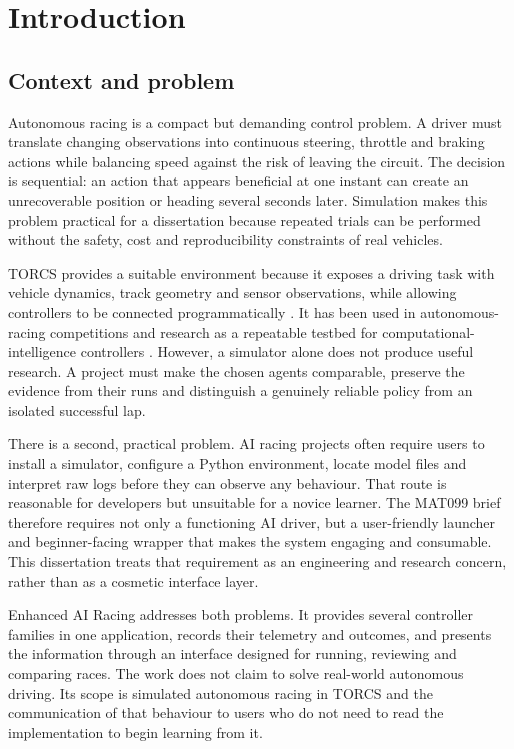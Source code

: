 \section{Introduction}
\label{ch:introduction}

\subsection{Context and problem}

Autonomous racing is a compact but demanding control problem. A driver must translate changing observations into continuous steering, throttle and braking actions while balancing speed against the risk of leaving the circuit. The decision is sequential: an action that appears beneficial at one instant can create an unrecoverable position or heading several seconds later. Simulation makes this problem practical for a dissertation because repeated trials can be performed without the safety, cost and reproducibility constraints of real vehicles.

TORCS provides a suitable environment because it exposes a driving task with vehicle dynamics, track geometry and sensor observations, while allowing controllers to be connected programmatically \parencite{torcs2026}. It has been used in autonomous-racing competitions and research as a repeatable testbed for computational-intelligence controllers \parencite{loiacono2010}. However, a simulator alone does not produce useful research. A project must make the chosen agents comparable, preserve the evidence from their runs and distinguish a genuinely reliable policy from an isolated successful lap.

There is a second, practical problem. AI racing projects often require users to install a simulator, configure a Python environment, locate model files and interpret raw logs before they can observe any behaviour. That route is reasonable for developers but unsuitable for a novice learner. The MAT099 brief therefore requires not only a functioning AI driver, but a user-friendly launcher and beginner-facing wrapper that makes the system engaging and consumable. This dissertation treats that requirement as an engineering and research concern, rather than as a cosmetic interface layer.

Enhanced AI Racing addresses both problems. It provides several controller families in one application, records their telemetry and outcomes, and presents the information through an interface designed for running, reviewing and comparing races. The work does not claim to solve real-world autonomous driving. Its scope is simulated autonomous racing in TORCS and the communication of that behaviour to users who do not need to read the implementation to begin learning from it.

